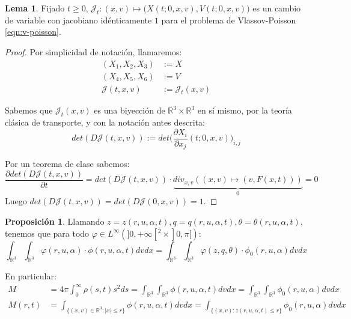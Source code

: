 \documentclass[a4paper,10pt]{scrartcl}
\theoremstyle{definition}
\newtheorem{lemma}{Lema}
\newtheorem{fact}{Proposición}
\numberwithin{equation}{section}
\begin{document}
\begin{lemma}
Fijado $t\ge 0$, $\mathcal{J}_t:(x,v) \mapsto \bigg(X(t;0,x,v), V(t;0,x,v)\bigg)$ es un cambio de variable con jacobiano idénticamente $1$ para el problema de Vlassov-Poisson \eqref{eqn:v-poisson}.
\label{lemma:cv-vp}
\end{lemma}
\begin{proof}
Por simplicidad de notación, llamaremos:
\begin{align*}
(X_1, X_2, X_3) &:= X\\
(X_4, X_5, X_6) &:= V\\
\mathcal{J}(t,x,v) &:= \mathcal{J}_t(x,v)
\end{align*}

Sabemos que $\mathcal{J}_t(x,v)$ es una biyección de $\mathbb{R}^3 \times \mathbb{R}^3$ en sí mismo, por la teoría clásica de transporte, y con la notación antes descrita:
 \[
 det(D\mathcal{J}(t,x,v)) := det\bigg(\frac{\partial{X_i}}{\partial x_j}(t;0,x,v)\bigg)_{i,j}
 \]

 Por un teorema de clase sabemos:
 \[
 \frac{\partial det(D\mathcal{J}(t,x,v))}{\partial t} = det(D\mathcal{J}(t,x,v)) \cdot \underbrace{div_{x,v}((x,v) \mapsto (v,F(x,t)))}_0 = 0
 \]
 Luego $det(D\mathcal{J}(t,x,v)) = det(D\mathcal{J}(0,x,v)) = 1$.
\end{proof}

\begin{fact}
\label{eqn:varphi}
Llamando $z = z(r,u,\alpha,t), q = q(r,u,\alpha,t), \theta = \theta(r,u,\alpha,t)$, tenemos que para todo $\varphi \in L^{\infty}(]0,+\infty[^2 \times ]0,\pi[)$:
\[
    \int_{\mathbb{R}^3}\int_{\mathbb{R}^3} \varphi(r,u,\alpha) \cdot \phi(r,u,\alpha,t) dv dx = 
    \int_{\mathbb{R}^3}\int_{\mathbb{R}^3} \varphi(z,q,\theta) \cdot \phi_0(r,u,\alpha) dv dx
\]

En particular:
\begin{align*}
M &= 4\pi \int_0^{\infty} \rho(s,t) s^2 ds = \int_{\mathbb{R}^3} \int_{\mathbb{R}^3} \phi(r,u,\alpha,t) dv dx = \int_{\mathbb{R}^3}\int_{\mathbb{R}^3} \phi_0(r,u,\alpha) dv dx\\
M(r,t) &= \int_{\{(x,v)\in \mathbb{R}^3:|x| \le r\}} \phi(r,u,\alpha,t) dv dx = \int_{\{(x,v): z(r,u,\alpha,t) \le r\}} \phi_0(r,u,\alpha) dv dx
\end{align*}
\end{fact}
\end{document}
